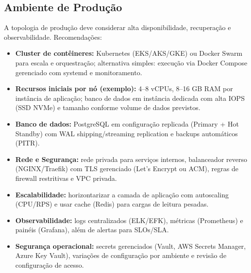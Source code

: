 \documentclass[12pt,a4paper]{article}
\begin{document}
\subsection{Ambiente de Produção}
A topologia de produção deve considerar alta disponibilidade, recuperação e observabilidade. Recomendações:
\begin{itemize}[leftmargin=*]
  \item \textbf{Cluster de contêineres:} Kubernetes (EKS/AKS/GKE) ou Docker Swarm para escala e orquestração; alternativa simples: execução via Docker Compose gerenciado com systemd e monitoramento.
  \item \textbf{Recursos iniciais por nó (exemplo):} 4–8 vCPUs, 8–16 GB RAM por instância de aplicação; banco de dados em instância dedicada com alta IOPS (SSD NVMe) e tamanho conforme volume de dados previstos.
  \item \textbf{Banco de dados:} PostgreSQL em configuração replicada (Primary + Hot Standby) com WAL shipping/streaming replication e backups automáticos (PITR).
  \item \textbf{Rede e Segurança:} rede privada para serviços internos, balanceador reverso (NGINX/Traefik) com TLS gerenciado (Let's Encrypt ou ACM), regras de firewall restritivas e VPC privada.
  \item \textbf{Escalabilidade:} horizontarizar a camada de aplicação com autoscaling (CPU/RPS) e usar cache (Redis) para cargas de leitura pesadas.
  \item \textbf{Observabilidade:} logs centralizados (ELK/EFK), métricas (Prometheus) e painéis (Grafana), além de alertas para SLOs/SLA.
  \item \textbf{Segurança operacional:} secrets gerenciados (Vault, AWS Secrets Manager, Azure Key Vault), variações de configuração por ambiente e revisão de configuração de acesso.
\end{itemize}
\end{document}
